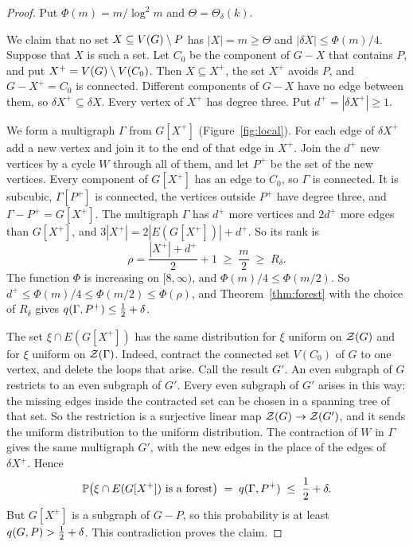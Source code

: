 \begin{proof}
Put $\Phi(m)=m/\log^{2}m$ and $\Theta=\Theta_\delta(k)$.

 We claim that no set
$X\subseteq V(G)\setminus P$ has $|X|=m\ge\Theta$ and $|\delta X|\le\Phi(m)/4$. Suppose that $X$ is such a
set. Let $C_0$ be the component of $G-X$ that contains $P$, and put $X^{+}=V(G)\setminus V(C_0)$. Then
$X\subseteq X^{+}$, the set $X^{+}$ avoids $P$, and $G-X^{+}=C_0$ is connected. Different components
of $G-X$ have no edge between them, so $\delta X^{+}\subseteq\delta X$. Every vertex of $X^{+}$ has
degree three. Put $d^{+}=|\delta X^{+}|\ge1$.

We form a multigraph $\Gamma$ from $G[X^{+}]$ (Figure~\ref{fig:local}). For each edge of $\delta X^{+}$ add a new vertex
and join it to the end of that edge in $X^{+}$. Join the $d^{+}$ new vertices by a cycle $W$
through all of them, and let $P^{+}$ be the set of the new vertices. Every component of
$G[X^{+}]$ has an edge to $C_0$, so $\Gamma$ is connected. It is subcubic, $\Gamma[P^{+}]$ is
connected, the vertices outside $P^{+}$ have degree three, and $\Gamma-P^{+}=G[X^{+}]$. The
multigraph $\Gamma$ has $d^{+}$ more vertices and $2d^{+}$ more edges than $G[X^{+}]$, and
$3|X^{+}|=2|E(G[X^{+}])|+d^{+}$. So its rank is
\[
  \rho=\frac{|X^{+}|+d^{+}}2+1\;\ge\;\frac m2\;\ge\;R_\delta .
\]
The function $\Phi$ is increasing on $[8,\infty)$, and $\Phi(m)/4\le\Phi(m/2)$. So
$d^{+}\le\Phi(m)/4\le\Phi(m/2)\le\Phi(\rho)$, and Theorem~\ref{thm:forest} with the choice of
$R_\delta$ gives $q(\Gamma,P^{+})\le\tfrac12+\delta$.

The set $\xi\cap E(G[X^{+}])$ has the same distribution for $\xi$ uniform on $\mathcal{Z}(G)$ and for
$\xi$ uniform on $\mathcal{Z}(\Gamma)$. Indeed, contract the connected set $V(C_0)$ of $G$ to one vertex,
and delete the loops that arise. Call the result $G'$. An even subgraph of $G$ restricts to an
even subgraph of $G'$. Every even subgraph of $G'$ arises in this way: the missing edges inside
the contracted set can be chosen in a spanning tree of that set. So the restriction is a
surjective linear map $\mathcal{Z}(G)\to\mathcal{Z}(G')$, and it sends the uniform distribution to the uniform
distribution. The contraction of $W$ in $\Gamma$ gives the same multigraph $G'$, with the new
edges in the place of the edges of $\delta X^{+}$. Hence
\[
  \mathbb{P}\bigl(\xi\cap E(G[X^{+}])\text{ is a forest}\bigr)\;=\;q(\Gamma,P^{+})\;\le\;\frac12+\delta .
\]
But $G[X^{+}]$ is a subgraph of $G-P$, so this probability is at least $q(G,P)>\tfrac12+\delta$. This
contradiction proves the claim.


\end{proof}
